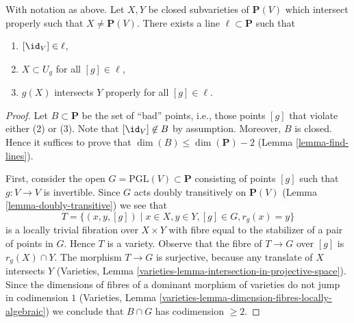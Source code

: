 \begin{lemma}
\label{lemma-make-family}
With notation as above. Let $X, Y$ be closed subvarieties of $\mathbf{P}(V)$
which intersect properly such that $X \not = \mathbf{P}(V)$. There exists
a line $\ell \subset \mathbf{P}$ such that
\begin{enumerate}
\item $[\id_V] \in \ell$,
\item $X \subset U_g$ for all $[g] \in \ell$,
\item $g(X)$ intersects $Y$ properly for all $[g] \in \ell$.
\end{enumerate}
\end{lemma}

\begin{proof}
Let $B \subset \mathbf{P}$ be the set of ``bad'' points, i.e., those
points $[g]$ that violate either (2) or (3). Note that
$[\id_V] \not \in B$ by assumption. Moreover, $B$ is closed.
Hence it suffices to prove that $\dim(B) \leq \dim(\mathbf{P}) - 2$
(Lemma \ref{lemma-find-lines}).

\medskip\noindent
First, consider the open $G = \text{PGL}(V) \subset \mathbf{P}$
consisting of points $[g]$ such that $g : V \to V$ is invertible.
Since $G$ acts doubly transitively on $\mathbf{P}(V)$
(Lemma \ref{lemma-doubly-transitive})
we see that
$$
T = \{(x, y, [g]) \mid x \in X, y \in Y, [g] \in G, r_g(x) = y\}
$$
is a locally trivial fibration over $X \times Y$ with fibre equal
to the stabilizer of a pair of points in $G$. Hence $T$ is a variety.
Observe that the fibre of $T \to G$ over $[g]$ is $r_g(X) \cap Y$.
The morphism $T \to G$ is surjective, because any translate of $X$
intersects $Y$
(Varieties, Lemma \ref{varieties-lemma-intersection-in-projective-space}).
Since the dimensions of fibres of a dominant morphism of varieties do
not jump in codimension $1$
(Varieties, Lemma \ref{varieties-lemma-dimension-fibres-locally-algebraic})
we conclude that $B \cap G$ has codimension $\geq 2$.


\end{proof}
